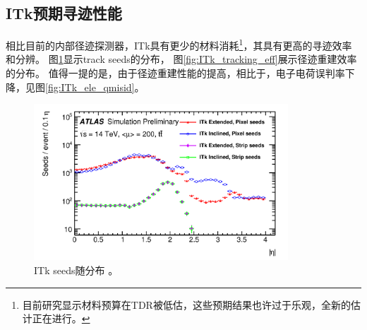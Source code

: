 \subsection{ITk预期寻迹性能}
相比目前的内部径迹探测器，ITk具有更少的材料消耗\footnote{目前研究显示材料预算在TDR被低估，这些预期结果也许过于乐观，全新的估计正在进行。}，其具有更高的寻迹效率和分辨。
图\ref{fig:ITk_seeds}显示track seeds的分布，
图\ref{fig:ITk_tracking_eff}展示径迹重建效率的分布。
值得一提的是，由于径迹重建性能的提高，相比于\RunTwo ，电子电荷误判率下降，见图\ref{fig:ITk_ele_qmisid}。
\begin{figure}[h]
\centering
 \includegraphics[width=0.85\textwidth]{fig/ITk_seeds.png}
 \caption{ITk seeds随\abseta 分布%
\cite{seeds_ITk}。}
 \label{fig:ITk_seeds}
\end{figure}
